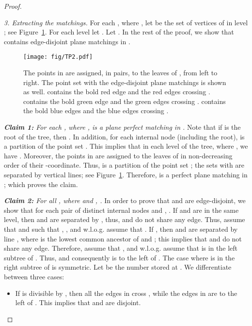 \documentclass[11pt,a4paper]{article}
\begin{document}
\begin{proof}
\begin{paragraph}{\em \small 3. Extracting the matchings.}
For each , where , let  be the set of vertices of  in level ; see Figure~\ref{matching-example-fig}. For each level  let . Let . 
In the rest of the proof, we show that  contains  edge-disjoint plane matchings in .
\end{paragraph}

\begin{figure}[htb]
  \centering
  \texttt{[image: fig/TP2.pdf]}
 \caption{The points in  are assigned, in pairs, to the leaves of , from left to right. The point set  with the edge-disjoint plane matchings is shown as well.  contains the bold red edge and the red edges crossing .  contains the bold green edge and the green edges crossing .  contains the bold blue edges and the blue edges crossing .}
  \label{matching-example-fig}
\end{figure}

\vspace{10pt}
{\em {\bf Claim 1:} For each , where ,  is a plane perfect matching in .} 
Note that if  is the root of the tree, then . In addition, for each internal node  (including the root),  is a partition of the point set . This implies that in each level  of the tree, where , we have . Moreover, the points in  are assigned to the leaves of  in non-decreasing order of their -coordinate. Thus,  is a partition of the point set ; the sets  with  are separated by vertical lines; see Figure~\ref{matching-example-fig}. Therefore,  is a perfect plane matching in ; which proves the claim.
\vspace{10pt}

\vspace{10pt}
{\em {\bf Claim 2:} For all , where  and , .}
In order to prove that  and  are edge-disjoint, we show that for each pair of distinct internal nodes  and , . If  and  are in the same level, then  and  are separated by , thus,  and  do not share any edge. Thus, assume that  and  such that , , and w.l.o.g. assume that . If , then  and  are separated by line , where  is the lowest common ancestor of  and ; this implies that  and  do not share any edge. Therefore, assume that , and w.l.o.g. assume that  is in the left subtree of . Thus, \textemdash and consequently \textemdash is to the left of . The case where  is in the right subtree of  is symmetric. Let  be the number stored at . We differentiate between three cases:

\begin{itemize}
  \item If  is divisible by , then all the edges in  cross , while the edges in  are to the left of . This implies that  and  are disjoint. 


\end{itemize}
\end{proof}
\end{document}
